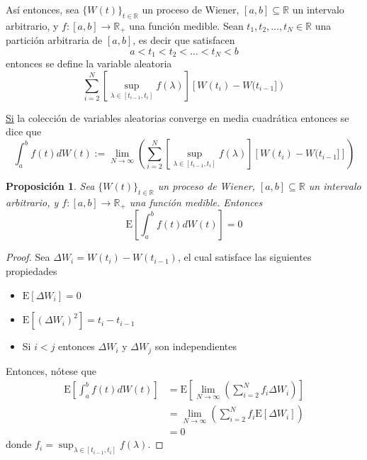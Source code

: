 \documentclass[12pt,letterpaper]{book}
\newtheorem{proposicion}[teorema]{Proposición}
\newcommand{\R}{\mathbb{R}}
\newcommand{\E}[1]{\mathrm{E}\left[ #1 \right]}
\begin{document}
Así entonces, sea $\{ W(t)\}_{t\in\R}$ un proceso de Wiener, $[a,b]\subseteq\R$ un intervalo arbitrario, y $f:[a,b]\longrightarrow\R_+$ una función medible.
%
Sean $t_1, t_2, \dots, t_N \in \R$ una partición arbitraria de $[a,b]$, es decir que satisfacen
\begin{equation}
a < t_1 < t_2 < \dots < t_N < b
\end{equation}
entonces se define la variable aleatoria
\begin{equation}
\sum_{i=2}^N \left[ \sup_{\lambda \in [t_{i-1},t_i]} f(\lambda) \right] \left[ W(t_i) - W(t_{i-1}] \right)
\end{equation}

\underline{Si} la colección de variables aleatorias converge en media cuadrática entonces se dice que
\begin{equation}
\int_a^b f(t) dW(t) :=
\lim_{N\rightarrow \infty} \left(
\sum_{i=2}^N \left[ \sup_{\lambda \in [t_{i-1},t_i]} f(\lambda) \right] \left[ W(t_i) - W(t_{i-1}] \right] \right)
\end{equation}

\begin{proposicion}
\label{prop:lazy000}
Sea $\{ W(t)\}_{t\in\R}$ un proceso de Wiener, $[a,b]\subseteq\R$ un intervalo arbitrario, y $f:[a,b]\longrightarrow\R_+$ una función medible. Entonces
\begin{equation}
\E{\int_a^b f(t) dW(t) } = 0
\end{equation}
\end{proposicion}
\begin{proof}
Sea $\Delta W_i = W(t_i) - W(t_{i-1})$, el cual satisface las siguientes propiedades
\begin{itemize}
\item $\E{\Delta W_i} = 0$
\item $\E{\left( \Delta W_i \right)^2} = t_{i} - t_{i-1}$
\item Si $i<j$ entonces $\Delta W_i$ y $\Delta W_j$ son independientes
\end{itemize} 

Entonces, nótese que
\begin{align*}
\E{\int_a^b f(t) dW(t) } &=
\E{ \lim_{N\rightarrow \infty} \left( \sum_{i=2}^N f_i \Delta W_i \right) } \\
&= 
\lim_{N\rightarrow \infty} \left( \sum_{i=2}^N f_i \E{ \Delta W_i } \right) \\
&= 0
\end{align*}
donde $f_i = \sup_{\lambda \in [t_{i-1},t_i]} f(\lambda)$.
\end{proof}
\end{document}
